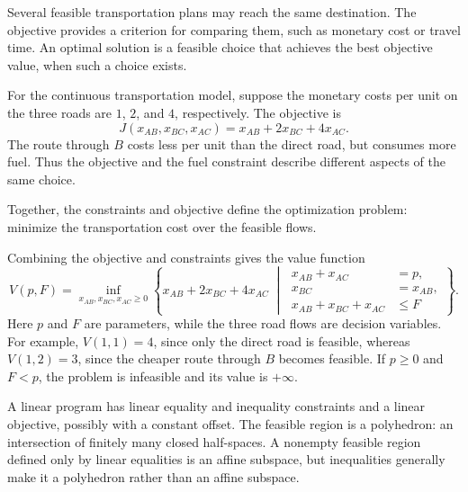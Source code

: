 Several feasible transportation plans may reach the same destination. The
objective provides a criterion for comparing them, such as monetary cost or
travel time. An optimal solution is a feasible choice that achieves the best
objective value, when such a choice exists.

For the continuous transportation model, suppose the monetary costs per unit
on the three roads are $1$, $2$, and $4$, respectively. The objective is
\[
J(x_{AB},x_{BC},x_{AC})=x_{AB}+2x_{BC}+4x_{AC}.
\]
The route through $B$ costs less per unit than the direct road, but consumes
more fuel. Thus the objective and the fuel constraint describe different
aspects of the same choice.

Together, the constraints and objective define the optimization problem:
minimize the transportation cost over the feasible flows.

Combining the objective and constraints gives the value function
\[
V(p,F)=\inf_{x_{AB},x_{BC},x_{AC}\ge0}
\left\{x_{AB}+2x_{BC}+4x_{AC}\;\middle|\;
\begin{aligned}
x_{AB}+x_{AC}&=p,\\
x_{BC}&=x_{AB},\\
x_{AB}+x_{BC}+x_{AC}&\le F
\end{aligned}\right\}.
\]
Here $p$ and $F$ are parameters, while the three road flows are decision
variables. For example, $V(1,1)=4$, since only the direct road is feasible,
whereas $V(1,2)=3$, since the cheaper route through $B$ becomes feasible.
If $p\ge0$ and $F<p$, the problem is infeasible and its value is $+\infty$.

A linear program has linear equality and inequality constraints and a linear
objective, possibly with a constant offset. The feasible region is a polyhedron: an intersection of finitely many closed half-spaces. A nonempty feasible region defined only by linear equalities is an affine subspace, but inequalities generally make it a polyhedron rather than an affine subspace.

